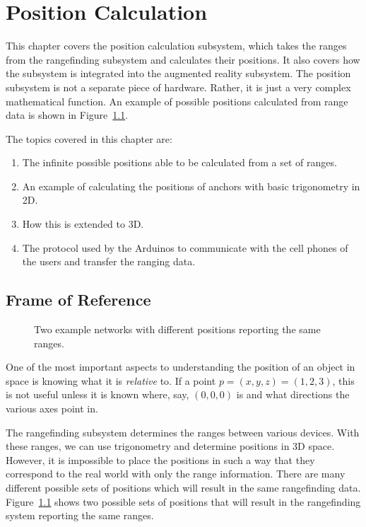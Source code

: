 

\chapter{Position Calculation} %

\label{PositionCalculation}


This chapter covers the position calculation subsystem, which takes the ranges from the rangefinding subsystem and calculates their positions. It also covers how the subsystem is integrated into the augmented reality subsystem. The position subsystem is not a separate piece of hardware. Rather, it is just a very complex mathematical function. An example of possible positions calculated from range data is shown in Figure~\ref{fig:FrameOfReference}.

The topics covered in this chapter are:
\begin{enumerate}
	\item The infinite possible positions able to be calculated from a set of ranges.
	\item An example of calculating the positions of anchors with basic trigonometry in 2D.
	\item How this is extended to 3D.
	\item The protocol used by the Arduinos to communicate with the cell phones of the users and transfer the ranging data.
\end{enumerate}

\section{Frame of Reference}
\label{FrameOfReference}
\begin{figure}
	\centering
	
	\decoRule
	\caption{Two example networks with different positions reporting the same ranges.}
	\label{fig:FrameOfReference}
\end{figure}

One of the most important aspects to understanding the position of an object in space is knowing what it is \emph{relative} to. If a point $p = (x, y, z) = (1, 2, 3)$, this is not useful unless it is known where, say, $(0, 0, 0)$ is and what directions the various axes point in.

The rangefinding subsystem determines the ranges between various devices. With these ranges, we can use trigonometry and determine positions in 3D space. However, it is impossible to place the positions in such a way that they correspond to the real world with only the range information. There are many different possible sets of positions which will result in the same rangefinding data. Figure~\ref{fig:FrameOfReference} shows two possible sets of positions that will result in the rangefinding system reporting the same ranges.

